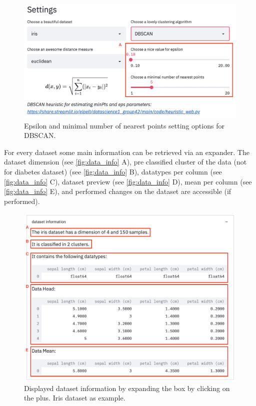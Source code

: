 \begin{figure}[H]
	\centering
	\includegraphics[width=\linewidth]{modules/web_frontend/DBSCAN_settings.png}
	\caption{Epsilon and minimal number of nearest points setting options for DBSCAN.}\label{fig:dbscan_para}
\end{figure}

For every dataset some main information can be retrieved via an expander. The dataset dimension (see \autoref{fig:data_info} A), pre classified cluster of the data (not for diabetes dataset) (see \autoref{fig:data_info} B), datatypes per column (see \autoref{fig:data_info} C), dataset preview (see \autoref{fig:data_info} D), mean per column (see \autoref{fig:data_info} E), and performed changes on the dataset are accessible (if performed).

\begin{figure}[H]
	\centering
	\includegraphics[width=\linewidth]{modules/web_frontend/dataset_inofs.png}
	\caption{Displayed dataset information by expanding the box by clicking on the plus. Iris dataset as example.}\label{fig:data_info}
\end{figure}

